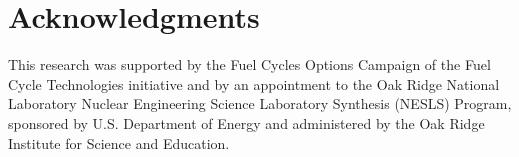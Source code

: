 \documentclass{anstrans}
\begin{document}
\section{Acknowledgments}
This research was supported by the Fuel Cycles Options Campaign of the Fuel Cycle Technologies initiative and by an appointment to the Oak Ridge National Laboratory Nuclear Engineering Science Laboratory Synthesis (NESLS) Program, sponsored by U.S. Department of Energy and administered by the Oak Ridge Institute for Science and Education.



\end{document}
